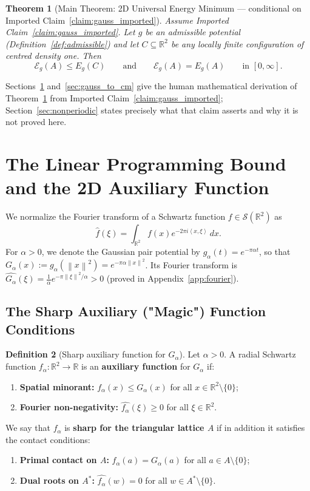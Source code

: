 \documentclass[11pt, a4paper]{article}
\newtheorem{theorem}{Theorem}[section]
\theoremstyle{definition}
\newtheorem{definition}[theorem]{Definition}
\theoremstyle{remark}
\newcommand{\R}{\mathbb{R}}
\newcommand{\Ecal}{\mathcal{E}}
\newcommand{\Scal}{\mathcal{S}}
\newcommand{\norm}[1]{\left\lVert #1 \right\rVert}
\newcommand{\inner}[2]{\left\langle #1, #2 \right\rangle}
\begin{document}
\begin{theorem}[Main Theorem: 2D Universal Energy Minimum --- conditional on Imported Claim~\ref{claim:gauss_imported}]
\label{thm:main}
Assume Imported Claim~\ref{claim:gauss_imported}. Let $g$ be an admissible potential (Definition~\ref{def:admissible}) and let $C \subseteq \R^2$ be any locally finite configuration of centred density one. Then
\[
\Ecal_g(A) \le E_g(C) \qquad \text{and} \qquad \Ecal_g(A) = E_g(A) \qquad \text{in } [0, \infty].
\]
\end{theorem}

\noindent Sections~\ref{sec:lp} and~\ref{sec:gauss_to_cm} give the human mathematical derivation of Theorem~\ref{thm:main} from Imported Claim~\ref{claim:gauss_imported}; Section~\ref{sec:nonperiodic} states precisely what that claim asserts and why it is not proved here.

\section{The Linear Programming Bound and the 2D Auxiliary Function}
\label{sec:lp}

We normalize the Fourier transform of a Schwartz function $f \in \Scal(\R^2)$ as
\[
\widehat{f}(\xi) = \int_{\R^2} f(x) e^{-2\pi i \inner{x}{\xi}} \, dx.
\]
For $\alpha > 0$, we denote the Gaussian pair potential by $g_\alpha(t) = e^{-\pi \alpha t}$, so that $G_\alpha(x) := g_\alpha(\norm{x}^2) = e^{-\pi \alpha \norm{x}^2}$. Its Fourier transform is $\widehat{G_\alpha}(\xi) = \frac{1}{\alpha} e^{-\pi \norm{\xi}^2 / \alpha} > 0$ (proved in Appendix~\ref{app:fourier}).

\subsection{The Sharp Auxiliary ("Magic") Function Conditions}

\begin{definition}[Sharp auxiliary function for $G_\alpha$]
\label{def:aux}
Let $\alpha > 0$. A radial Schwartz function $f_\alpha : \R^2 \to \R$ is an \textbf{auxiliary function} for $G_\alpha$ if:
\begin{enumerate}[label=(\roman*)]
    \item \textbf{Spatial minorant:} $f_\alpha(x) \le G_\alpha(x)$ for all $x \in \R^2 \setminus \{0\}$;
    \item \textbf{Fourier non-negativity:} $\widehat{f_\alpha}(\xi) \ge 0$ for all $\xi \in \R^2$.
\end{enumerate}
We say that $f_\alpha$ is \textbf{sharp for the triangular lattice $A$} if in addition it satisfies the contact conditions:
\begin{enumerate}[label=(\roman*), start=3]
    \item \textbf{Primal contact on $A$:} $f_\alpha(a) = G_\alpha(a)$ for all $a \in A \setminus \{0\}$;
    \item \textbf{Dual roots on $A^*$:} $\widehat{f_\alpha}(w) = 0$ for all $w \in A^* \setminus \{0\}$.
\end{enumerate}
\end{definition}
\end{document}
